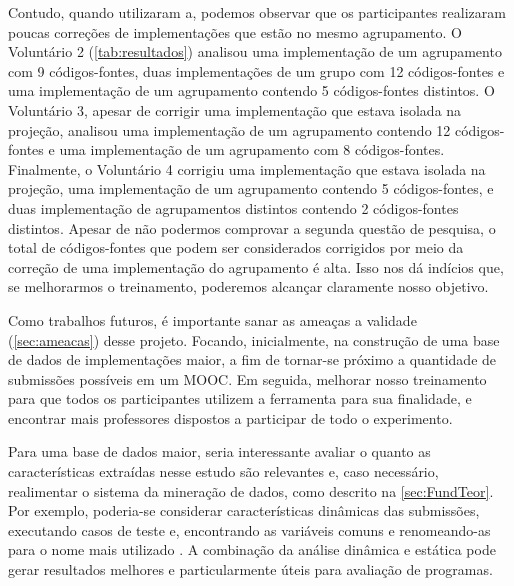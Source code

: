 	Contudo, quando utilizaram a, podemos observar
	que os participantes realizaram poucas correções de implementações que estão no
	mesmo agrupamento. O Voluntário 2 (\cref{tab:resultados}) analisou uma implementação
	de um agrupamento com 9 códigos-fontes, duas implementações de um grupo com 12
	códigos-fontes e uma implementação de um agrupamento contendo 5 códigos-fontes
	distintos. O Voluntário 3, apesar de corrigir uma implementação que estava isolada
	na projeção, analisou uma implementação de um agrupamento contendo 12 códigos-fontes
	e uma implementação de um agrupamento com 8 códigos-fontes. Finalmente, o Voluntário 4
	corrigiu uma implementação que estava isolada na projeção, uma implementação de
	um agrupamento contendo 5 códigos-fontes, e duas implementação de agrupamentos
	distintos contendo 2 códigos-fontes distintos. Apesar de não podermos comprovar
	a segunda questão de pesquisa, o total de códigos-fontes que podem ser considerados
	corrigidos por meio da correção de uma implementação do agrupamento é alta. Isso
	nos dá indícios que, se melhorarmos	o treinamento, poderemos alcançar claramente
	nosso objetivo.
	
	
	Como trabalhos futuros, é importante sanar as ameaças a validade (\cref{sec:ameacas})
	desse projeto. Focando, inicialmente, na construção de uma base de dados de
	implementações maior, a fim de tornar-se próximo a quantidade de submissões
	possíveis em um \acs{MOOC}. Em seguida, melhorar nosso treinamento para que
	todos os participantes utilizem a ferramenta para sua finalidade, e encontrar
	mais professores dispostos a participar de todo o experimento.
	
	Para uma base de dados maior, seria interessante avaliar o quanto as características
	extraídas nesse estudo são relevantes e, caso necessário, realimentar o
	sistema da mineração de dados, como descrito na \cref{sec:FundTeor}. Por
	exemplo, poderia-se considerar características dinâmicas das submissões, executando
	casos de teste e, encontrando as variáveis
	comuns e renomeando-as para o nome mais utilizado \cite{Glassman:2015}.
	A combinação da análise dinâmica e estática pode gerar resultados melhores e
	particularmente úteis para avaliação de programas.
